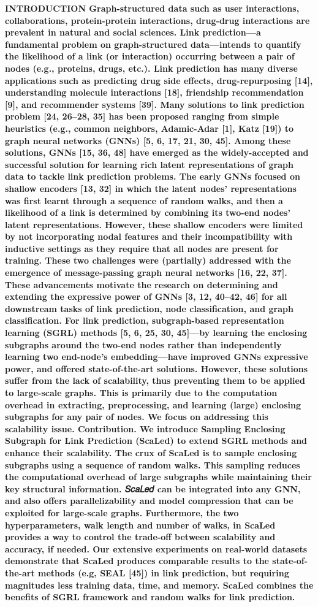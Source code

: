 \documentclass{article}
\begin{document}
\textbf{INTRODUCTION
Graph-structured data such as user interactions, collaborations,
protein-protein interactions, drug-drug interactions are prevalent in
natural and social sciences. Link prediction—a fundamental problem
on graph-structured data—intends to quantify the likelihood of a
link (or interaction) occurring between a pair of nodes (e.g., proteins,
drugs, etc.). Link prediction has many diverse applications such as
predicting drug side effects, drug-repurposing [14], understanding
molecule interactions [18], friendship recommendation [9], and
recommender systems [39].
Many solutions to link prediction problem [24, 26–28, 35] has
been proposed ranging from simple heuristics (e.g., common neighbors, Adamic-Adar [1], Katz [19]) to graph neural networks (GNNs)
[5, 6, 17, 21, 30, 45]. Among these solutions, GNNs [15, 36, 48]
have emerged as the widely-accepted and successful solution for
learning rich latent representations of graph data to tackle link
prediction problems. The early GNNs focused on shallow encoders
[13, 32] in which the latent nodes’ representations was first learnt
through a sequence of random walks, and then a likelihood of a
link is determined by combining its two-end nodes’ latent representations. However, these shallow encoders were limited by not
incorporating nodal features and their incompatibility with inductive settings as they require that all nodes are present for training.
These two challenges were (partially) addressed with the emergence of message-passing graph neural networks [16, 22, 37]. These
advancements motivate the research on determining and extending
the expressive power of GNNs [3, 12, 40–42, 46] for all downstream
tasks of link prediction, node classification, and graph classification.
For link prediction, subgraph-based representation learning (SGRL)
methods [5, 6, 25, 30, 45]—by learning the enclosing subgraphs
around the two-end nodes rather than independently learning two
end-node’s embedding—have improved GNNs expressive power,
and offered state-of-the-art solutions. However, these solutions suffer from the lack of scalability, thus preventing them to be applied
to large-scale graphs. This is primarily due to the computation
overhead in extracting, preprocessing, and learning (large) enclosing subgraphs for any pair of nodes. We focus on addressing this
scalability issue.
Contribution. We introduce Sampling Enclosing Subgraph for Link
Prediction (ScaLed) to extend SGRL methods and enhance their scalability. The crux of ScaLed is to sample enclosing subgraphs using
a sequence of random walks. This sampling reduces the computational overhead of large subgraphs while maintaining their key
structural information. 𝑆𝑐𝑎𝐿𝑒𝑑 can be integrated into any GNN,
and also offers parallelizability and model compression that can be
exploited for large-scale graphs. Furthermore, the two hyperparameters, walk length and number of walks, in ScaLed provides a way
to control the trade-off between scalability and accuracy, if needed.
Our extensive experiments on real-world datasets demonstrate that
ScaLed produces comparable results to the state-of-the-art methods
(e.g, SEAL [45]) in link prediction, but requiring magnitudes less
training data, time, and memory. ScaLed combines the benefits of
SGRL framework and random walks for link prediction.
}\\
\end{document}
